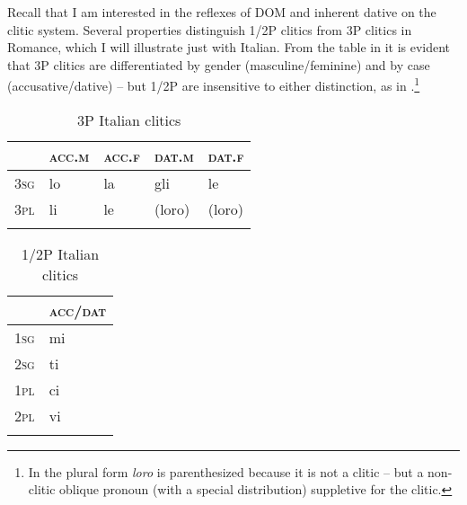 \documentclass[output=paper,colorlinks,citecolor=brown,nonflat]{./langscibook}
\begin{document}
Recall that I am interested in the reflexes of DOM and inherent dative on the clitic system. {Several properties distinguish 1/2P clitics from 3P clitics in Romance, which I will illustrate just with Italian. From the table in  it is evident that 3P clitics are differentiated by gender (masculine/feminine) and by case (accusative/dative) – but 1/2P are insensitive to either distinction, as in .}\footnote{In  the plural form \emph{loro} is parenthesized because it is not a clitic -- but a non-clitic oblique pronoun (with a special distribution) suppletive for the clitic.}


\begin{table}
\caption{3P Italian clitics}\label{extab:manzini:11}
\begin{tabular}{lllll}
\lsptoprule
 & \textsc{acc.m} & \textsc{acc.f} & \textsc{dat.m} & \textsc{dat.f}\\
 \midrule
\textsc{3sg} & {lo} & {la} & {gli} & {le}\\
\textsc{3pl} & {li} & {le} &  ({loro}) & ({loro})\\
\lspbottomrule
\end{tabular}
\end{table}



\begin{table}
\caption{1/2P Italian clitics}\label{extab:manzini:12}
\begin{tabular}{ll}
\lsptoprule
& \textsc{acc}/\textsc{dat}\\
\midrule
\textsc{1sg} & {mi} \\
\textsc{2sg} & {ti} \\
\textsc{1pl} & {ci} \\
\textsc{2pl} & {vi} \\
\lspbottomrule
\end{tabular}
\end{table}
\end{document}
